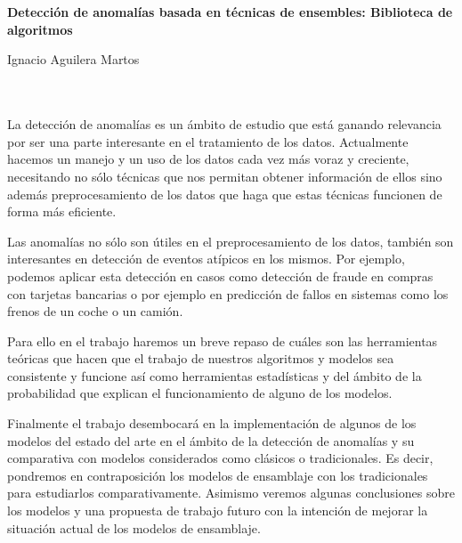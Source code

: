 \chapter*{}






\cleardoublepage
\thispagestyle{empty}

\begin{center}
{\large\bfseries Detección de anomalías basada en técnicas de ensembles: Biblioteca de algoritmos}\\
\end{center}
\begin{center}
Ignacio Aguilera Martos\\
\end{center}

\\

\vspace{0.7cm}
\\

La detección de anomalías es un ámbito de estudio que está ganando relevancia por ser una parte interesante en el tratamiento de los datos. Actualmente hacemos un manejo y un uso de los datos cada vez más voraz y creciente, necesitando no sólo técnicas que nos permitan obtener información de ellos sino además preprocesamiento de los datos que haga que estas técnicas funcionen de forma más eficiente. 

Las anomalías no sólo son útiles en el preprocesamiento de los datos, también son interesantes en detección de eventos atípicos en los mismos. Por ejemplo, podemos aplicar esta detección en casos como detección de fraude en compras con tarjetas bancarias o por ejemplo en predicción de fallos en sistemas como los frenos de un coche o un camión.

Para ello en el trabajo haremos un breve repaso de cuáles son las herramientas teóricas que hacen que el trabajo de nuestros algoritmos y modelos sea consistente y funcione así como herramientas estadísticas y del ámbito de la probabilidad que explican el funcionamiento de alguno de los modelos. 

Finalmente el trabajo desembocará en la implementación de algunos de los modelos del estado del arte en el ámbito de la detección de anomalías y su comparativa con modelos considerados como clásicos o tradicionales. Es decir, pondremos en contraposición los modelos de ensamblaje con los tradicionales para estudiarlos comparativamente. Asimismo veremos algunas conclusiones sobre los modelos y una propuesta de trabajo futuro con la intención de mejorar la situación actual de los modelos de ensamblaje.

